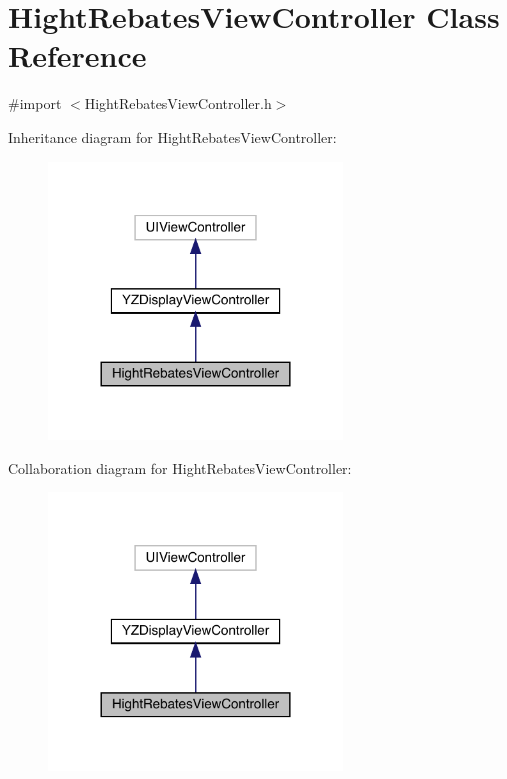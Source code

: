 \hypertarget{interface_hight_rebates_view_controller}{}\section{Hight\+Rebates\+View\+Controller Class Reference}
\label{interface_hight_rebates_view_controller}


{\ttfamily \#import $<$Hight\+Rebates\+View\+Controller.\+h$>$}



Inheritance diagram for Hight\+Rebates\+View\+Controller\+:\nopagebreak
\begin{figure}[H]
\begin{center}
\leavevmode
\includegraphics[width=221pt]{interface_hight_rebates_view_controller__inherit__graph}
\end{center}
\end{figure}


Collaboration diagram for Hight\+Rebates\+View\+Controller\+:\nopagebreak
\begin{figure}[H]
\begin{center}
\leavevmode
\includegraphics[width=221pt]{interface_hight_rebates_view_controller__coll__graph}
\end{center}
\end{figure}

